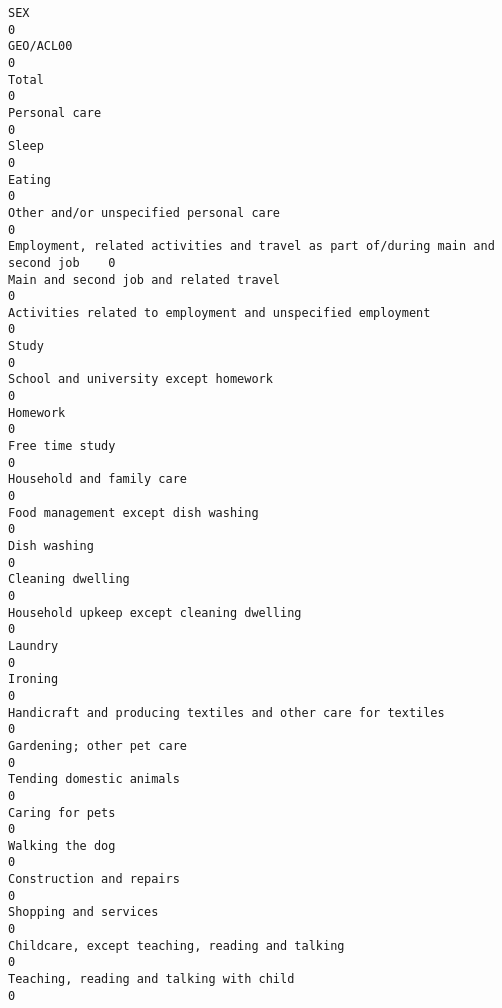\documentclass[11pt]{article}
\begin{document}
    \begin{Verbatim}[commandchars=\\\{\}]
SEX                                                                                0
GEO/ACL00                                                                          0
Total                                                                              0
Personal care                                                                      0
Sleep                                                                              0
Eating                                                                             0
Other and/or unspecified personal care                                             0
Employment, related activities and travel as part of/during main and second job    0
Main and second job and related travel                                             0
Activities related to employment and unspecified employment                        0
Study                                                                              0
School and university except homework                                              0
Homework                                                                           0
Free time study                                                                    0
Household and family care                                                          0
Food management except dish washing                                                0
Dish washing                                                                       0
Cleaning dwelling                                                                  0
Household upkeep except cleaning dwelling                                          0
Laundry                                                                            0
Ironing                                                                            0
Handicraft and producing textiles and other care for textiles                      0
Gardening; other pet care                                                          0
Tending domestic animals                                                           0
Caring for pets                                                                    0
Walking the dog                                                                    0
Construction and repairs                                                           0
Shopping and services                                                              0
Childcare, except teaching, reading and talking                                    0
Teaching, reading and talking with child                                           0

\end{Verbatim}
\end{document}
